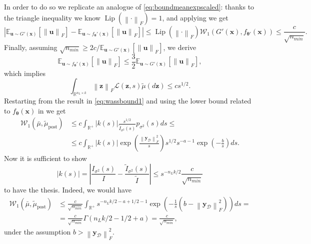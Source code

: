 \documentclass[a4paper, 11pt, reqno]{amsart}
\theoremstyle{plain}
\theoremstyle{remark}
\theoremstyle{definition}
\newcommand{\mean}[2][\kern-0.5pt]{\mathbb{E}_{#1}\left[#2\right]}
\newcommand{\wass}[3][2]{\mathcal{W}_{#1}\left(#2, #3\right)}
\newcommand{\real}{\mathbb{R}}
\newcommand{\norm}[1]{\left\lVert#1\right\rVert}
\newcommand{\lipschitz}[1]{\operatorname{Lip}\left(#1\right)}
\renewcommand{\exp}[1]{\operatorname{exp}\left(#1\right)}
\begin{document}
In order to do so we replicate an analogue of \cref{eq:boundmeanexpscaled}: thanks to the triangle inequality we know $\lipschitz{\norm{\bm{\cdot}}_F} = 1$, and applying  we get
\begin{equation*}
	\left|\mean[\bm{u} \sim G'(\bm{x})]{\norm{\bm{u}}_F} - \mean[\bm{u} \sim f_{\bm{\theta}}'(\bm{x})]{\norm{\bm{u}}_F}\right| \leq \lipschitz{\norm{\bm{\cdot}}_F} \wass[1]{G'(\bm{x})}{f_{\bm{\theta}'}(\bm{x})} \leq \frac{c}{\sqrt{n_{min}}}.
\end{equation*}
Finally, assuming $\sqrt{n_{min}} \geq 2 c / \mean[\bm{u} \sim G'(\bm{x})]{\norm{\bm{u}}_F}$, we derive
\begin{equation*}
	\mean[\bm{u} \sim f_{\bm{\theta}}'(\bm{x})]{\norm{\bm{u}}_F} \leq \frac{3}{2} \mean[\bm{u} \sim G'(\bm{x})]{\norm{\bm{u}}_F},
\end{equation*}
which implies 
\begin{equation*}
	\int_{\real^{n_L \times k}} \norm{\bm{z}}_F \mathcal{L}(\bm{z}, s) \widetilde{\mu}(d\bm{z}) \leq c s^{1/2}.
\end{equation*}
Restarting from the result in \cref{eq:wassbound1} and using the lower bound related to $f_{\bm{\theta}}(\bm{x})$ in  we get
\begin{align*}
	\wass[1]{\bar{\mu}}{\widetilde{\mu}_{\mathrm{post}}} & \leq c \int_{\real^+} |k(s)| \frac{s^{1/2}}{\widetilde{\mathit{I}}_{\sigma^2}(s)} p_{\sigma^2}(s) ds \leq \\
	& \leq c \int_{\real^+} |k(s)| \exp{\frac{\norm{\bm{y}_{\mathcal{D}}}_F^2}{s}} s^{1/2} s^{-a - 1} \exp{-\frac{b}{s}} ds. 
\end{align*}
Now it is sufficient to show 
\begin{equation} \label{eq:boundks}
	|k(s)| = \left|\frac{\mathit{I}_{\sigma^2}(s)}{\mathit{I}} - \frac{\widetilde{\mathit{I}}_{\sigma^2}(s)}{\widetilde{\mathit{I}}}\right| \leq s^{-n_L k / 2} \frac{c}{\sqrt{n_{min}}}
\end{equation}
to have the thesis. Indeed, we would have
\begin{align*}
	\wass[1]{\bar{\mu}}{\widetilde{\mu}_{\mathrm{post}}} & \leq \frac{c}{\sqrt{n_{min}}} \int_{\real^+} s^{-n_L k / 2 - a + 1/2 - 1} \exp{-\frac{1}{s} \left(b - \norm{\bm{y}_{\mathcal{D}}}_F^2\right)} ds = \nonumber \\
	& = \frac{c}{\sqrt{n_{min}}} \Gamma\left(n_L k / 2 - 1/2 + a\right) = \frac{c}{\sqrt{n_{min}}}, 
\end{align*}
under the assumption $b > \norm{\bm{y}_{\mathcal{D}}}_F^2$. \\
\end{document}
